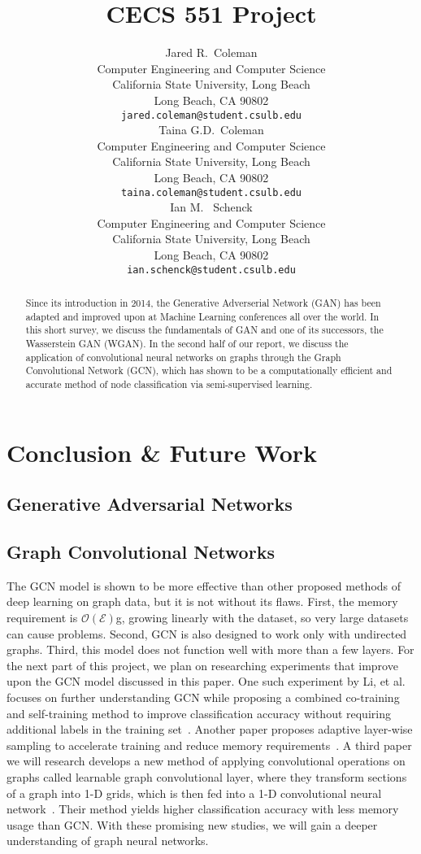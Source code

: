 \documentclass{article}
\title{CECS 551 Project}
\author{%
  Jared R.~Coleman\\
  Computer Engineering and Computer Science\\
  California State University, Long Beach\\
  Long Beach, CA 90802 \\
  \texttt{jared.coleman@student.csulb.edu} \\
  \And 
  Taina G.D.~Coleman\\
  Computer Engineering and Computer Science\\
  California State University, Long Beach\\
  Long Beach, CA 90802 \\
  \texttt{taina.coleman@student.csulb.edu} \\
  \And 
  Ian M. ~Schenck\\
  Computer Engineering and Computer Science\\
  California State University, Long Beach\\
  Long Beach, CA 90802 \\
  \texttt{ian.schenck@student.csulb.edu} \\
}
\begin{document}
\setcounter{equation}{0}

\maketitle

\begin{abstract}
   Since its introduction in 2014, the Generative Adverserial Network (GAN) has been adapted and improved upon at Machine Learning conferences all over the world. In this short survey, we discuss the fundamentals of GAN and one of its successors, the Wasserstein GAN (WGAN). In the second half of our report, we discuss the application of convolutional neural networks on graphs through the Graph Convolutional Network (GCN), which has shown to be a computationally efficient and accurate method of node classification via semi-supervised learning.
\end{abstract}






\section{Conclusion \& Future Work}
  \subsection{Generative Adversarial Networks}
  \subsection{Graph Convolutional Networks}
  The GCN model is shown to be more effective than other proposed methods of deep learning on graph data, but it is not without its flaws. First, the memory requirement is $\mathcal{O}(\mathcal{E})$g, growing linearly with the dataset, so very large datasets can cause problems. Second, GCN is also designed to work only with undirected graphs. Third, this model does not function well with more than a few layers.
  For the next part of this project, we plan on researching experiments that improve upon the GCN model discussed in this paper. One such experiment by Li, et al. focuses on further understanding GCN while proposing a combined co-training and self-training method to improve classification accuracy without requiring additional labels in the training set~\cite{Li2018}. Another paper proposes adaptive layer-wise sampling to accelerate training and reduce memory requirements~\cite{Huang2018}. A third paper we will research develops a new method of applying convolutional operations on graphs called learnable graph convolutional layer, where they transform sections of a graph into 1-D grids, which is then fed into a 1-D convolutional neural network~\cite{Gao2018}. Their method yields higher classification accuracy with less memory usage than GCN. With these promising new studies, we will gain a deeper understanding of graph neural networks.
  



\end{document}
